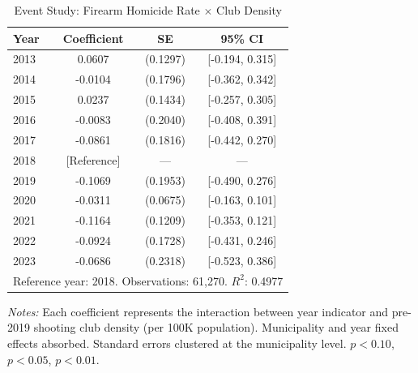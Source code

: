 
\begin{table}[t]
\centering
\caption{Event Study: Firearm Homicide Rate $\times$ Club Density}
\label{tab:event_study}
\begin{tabular}{lccc}
\toprule
Year & Coefficient & SE & 95\% CI \\
\midrule
2013 & 0.0607 & (0.1297) & [-0.194, 0.315] \\
2014 & -0.0104 & (0.1796) & [-0.362, 0.342] \\
2015 & 0.0237 & (0.1434) & [-0.257, 0.305] \\
2016 & -0.0083 & (0.2040) & [-0.408, 0.391] \\
2017 & -0.0861 & (0.1816) & [-0.442, 0.270] \\
2018 & [Reference] & --- & --- \\
2019 & -0.1069 & (0.1953) & [-0.490, 0.276] \\
2020 & -0.0311 & (0.0675) & [-0.163, 0.101] \\
2021 & -0.1164 & (0.1209) & [-0.353, 0.121] \\
2022 & -0.0924 & (0.1728) & [-0.431, 0.246] \\
2023 & -0.0686 & (0.2318) & [-0.523, 0.386] \\
\midrule
\multicolumn{4}{l}{Reference year: 2018. Observations: 61,270. $R^2$: 0.4977} \\
\bottomrule
\end{tabular}
\begin{flushleft}\small
\textit{Notes:} Each coefficient represents the interaction between year indicator and pre-2019 shooting club density (per 100K population). Municipality and year fixed effects absorbed. Standard errors clustered at the municipality level. \sym{*} $p<0.10$, \sym{**} $p<0.05$, \sym{***} $p<0.01$.
\end{flushleft}
\end{table}

